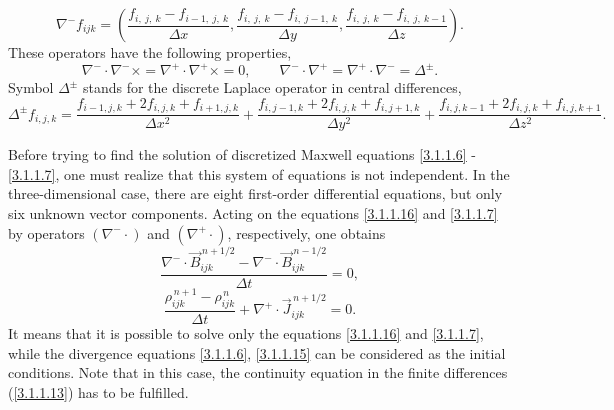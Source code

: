 \begin{equation}
\label{3.1.1.9}
\nabla^{-} f_{i j k} = \left(\frac{f_{i,\: j,\: k} - f_{i - 1,\: j,\: k}}{\Delta x}, \frac{f_{i,\: j,\: k} - f_{i,\: j - 1,\: k}}{\Delta y}, \frac{f_{i,\: j,\: k} - f_{i,\: j,\: k - 1}}{\Delta z} \right).
\end{equation}
These operators have the following properties,
\begin{equation}
\label{3.1.1.10}
\nabla^{-} \cdot \nabla^{-} \times = \nabla^{+} \cdot \nabla^{+} \times = 0, \qquad \nabla^{-} \cdot \nabla^{+} = \nabla^{+} \cdot \nabla^{-} = \Delta^{\pm}.
\end{equation}
Symbol $ \Delta^{\pm} $ stands for the discrete Laplace operator in central differences,
\begin{equation}
\label{3.1.1.11}
\Delta^{\pm} f_{i, j, k} = \frac{f_{i - 1, j, k} + 2 f_{i, j, k} + f_{i + 1, j, k}}{\Delta x^{2}} + \frac{f_{i, j - 1, k} + 2 f_{i, j, k} + f_{i, j + 1, k}}{\Delta y^{2}} + \frac{f_{i, j, k - 1} + 2 f_{i, j, k} + f_{i, j, k + 1}}{\Delta z^{2}}.
\end{equation}

Before trying to find the solution of discretized Maxwell equations \ref{3.1.1.6} - \ref{3.1.1.7}, one must realize that this system of equations is not independent. In the three-dimensional case, there are eight first-order differential equations, but only six unknown vector components. Acting on the equations \ref{3.1.1.16} and \ref{3.1.1.7} by operators $ \left(\nabla^{-}\cdot\right) $ and $ \left(\nabla^{+}\cdot\right) $, respectively, one obtains
\begin{equation}
\label{3.1.1.12}
\frac{\nabla^{-} \cdot \vec{B}_{ijk}^{\,n + 1/2} - \nabla^{-} \cdot \vec{B}_{ijk}^{\,n - 1/2}}{\Delta t} = 0,
\end{equation}
\begin{equation}
\label{3.1.1.13}
\frac{\rho_{ijk}^{\,n + 1} - \rho_{ijk}^{\,n}}{\Delta t} + \nabla^{+} \cdot \vec{J}_{ijk}^{\,n + 1/2} = 0.
\end{equation}
It means that it is possible to solve only the equations \ref{3.1.1.16} and \ref{3.1.1.7}, while the divergence equations \ref{3.1.1.6}, \ref{3.1.1.15} can be considered as the initial conditions. Note that in this case, the continuity equation in the finite differences (\ref{3.1.1.13}) has to be fulfilled.
